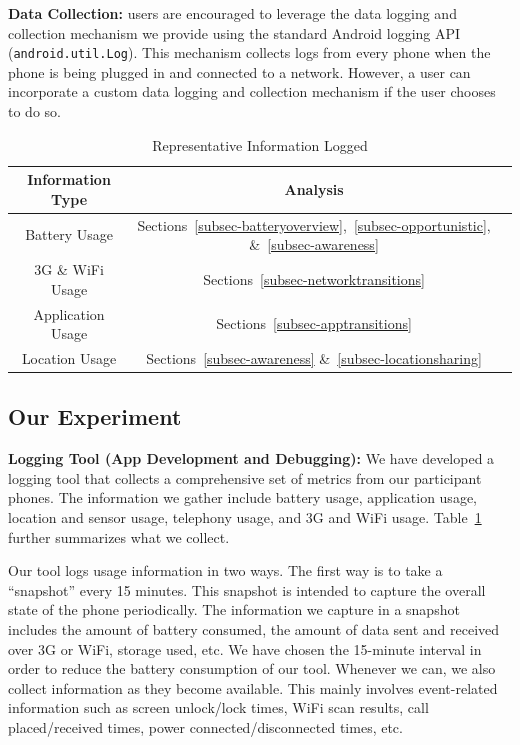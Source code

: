 {\bf Data Collection:} \PhoneLab{} users are encouraged to leverage the data
logging and collection mechanism we provide using the standard Android logging
API (\texttt{android.util.Log}). This mechanism collects logs from every phone
when the phone is being plugged in and connected to a network. However, a
\PhoneLab{} user can incorporate a custom data logging and collection mechanism
if the user chooses to do so.

\begin{table}[t]
\centering
\begin{tabular}{|c|c|c|}
\hline
Information Type & Analysis\\
\hline
Battery Usage &
Sections~\ref{subsec-batteryoverview},~\ref{subsec-opportunistic},
\&~\ref{subsec-awareness}\\
3G \& WiFi Usage & Sections~\ref{subsec-networktransitions}\\
Application Usage & Sections~\ref{subsec-apptransitions}\\
Location Usage & Sections~\ref{subsec-awareness}
\&~\ref{subsec-locationsharing}\\
\hline
\end{tabular}
\caption{Representative Information Logged }
\label{tab:information-logged}
\end{table}


\subsection{Our Experiment}

{\bf Logging Tool (App Development and Debugging):} We have developed a logging
tool that collects a comprehensive set of metrics from our participant phones.
The information we gather include battery usage, application usage, location and
sensor usage, telephony usage, and 3G and WiFi usage.
Table~\ref{tab:information-logged} further summarizes what we collect.

Our tool logs usage information in two ways. The first way is to take a
``snapshot'' every 15 minutes. This snapshot is intended to capture the overall
state of the phone periodically. The information we capture in a snapshot
includes the amount of battery consumed, the amount of data sent and received
over 3G or WiFi, storage used, etc. We have chosen the 15-minute interval in
order to reduce the battery consumption of our tool. Whenever we can, we also collect information
as they become available. This mainly involves event-related information such as
screen unlock/lock times, WiFi scan results, call placed/received times, power
connected/disconnected times, etc.

